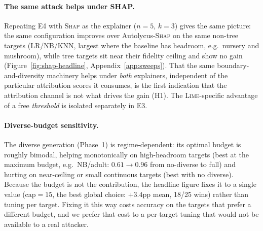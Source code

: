 \documentclass[sigconf,anonymous,review]{acmart}
\begin{document}
\paragraph{The same attack helps under SHAP.}
Repeating E4 with \textsc{Shap} as the explainer ($n{=}5$, $k{=}3$) gives the same picture: the
same configuration improves over Autolycus-\textsc{Shap} on the same non-tree targets (LR/NB/KNN,
largest where the baseline has headroom, e.g.\ nursery and mushroom), while tree targets sit near
their fidelity ceiling and show no gain (Figure~\ref{fig:shap-headline}, Appendix~\ref{app:sweeps}).
That the same boundary-and-diversity machinery helps under \emph{both} explainers, independent of the particular attribution scores it consumes, is the first indication that the attribution channel is
not what drives the gain (H1). The \textsc{Lime}-specific advantage of a free \emph{threshold} is
isolated separately in E3.

\paragraph{Diverse-budget sensitivity.}
The diverse generation (Phase~1) is regime-dependent: its optimal budget is roughly bimodal,
helping monotonically on high-headroom targets (best at the maximum budget, e.g.\ NB/adult:
$0.61{\to}0.96$ from no-diverse to full) and hurting on near-ceiling or small continuous targets
(best with no diverse). Because the budget is not the contribution, the headline figure fixes it
to a single value (cap${=}15$, the best global choice: $+3.4$pp mean, 18/25 wins) rather than
tuning per target. Fixing it this way costs accuracy on the targets that prefer a different budget,
and we prefer that cost to a per-target tuning that would not be available to a real attacker.
\end{document}
